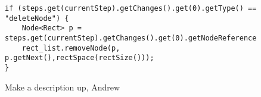 \begin{figure}
\begin{center}
\begin{verbatim}
if (steps.get(currentStep).getChanges().get(0).getType() == "deleteNode") {
    Node<Rect> p = steps.get(currentStep).getChanges().get(0).getNodeReference();
    rect_list.removeNode(p, p.getNext(),rectSpace(rectSize()));
} 
\end{verbatim}
\end{center}
\caption{Make a description up, Andrew}
\label{fig:linkedListsDeletion}
\end{figure}